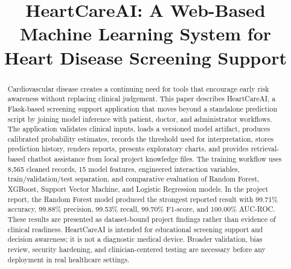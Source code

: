 \documentclass[conference]{IEEEtran}
\begin{document}
\title{HeartCareAI: A Web-Based Machine Learning System for Heart Disease Screening Support}

\author{
\and
{}
\and
{}
}

\maketitle

\begin{abstract}
Cardiovascular disease creates a continuing need for tools that encourage early risk awareness without replacing clinical judgement. This paper describes HeartCareAI, a Flask-based screening support application that moves beyond a standalone prediction script by joining model inference with patient, doctor, and administrator workflows. The application validates clinical inputs, loads a versioned model artifact, produces calibrated probability estimates, records the threshold used for interpretation, stores prediction history, renders reports, presents exploratory charts, and provides retrieval-based chatbot assistance from local project knowledge files. The training workflow uses 8,565 cleaned records, 15 model features, engineered interaction variables, train/validation/test separation, and comparative evaluation of Random Forest, XGBoost, Support Vector Machine, and Logistic Regression models. In the project report, the Random Forest model produced the strongest reported result with 99.71\% accuracy, 99.88\% precision, 99.53\% recall, 99.70\% F1-score, and 100.00\% AUC-ROC. These results are presented as dataset-bound project findings rather than evidence of clinical readiness. HeartCareAI is intended for educational screening support and decision awareness; it is not a diagnostic medical device. Broader validation, bias review, security hardening, and clinician-centered testing are necessary before any deployment in real healthcare settings.
\end{abstract}
\end{document}
